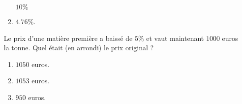 \begin{exercice}
\begin{multicols}{2}
\begin{enumerate}
\begin{enumerate}
                \( 10\%\)
            \item
                \( 4.76\%\).
        \end{enumerate}
        Le prix d'une matière première a baissé de \( 5\%\) et vaut maintenant \( 1000\) euros la tonne. Quel était (en arrondi) le prix original ?
        \begin{enumerate}
            \item
                \( 1050\) euros.
            \item
                \( 1053\) euros.
            \item
                \( 950\) euros.
        \end{enumerate}
    \end{enumerate}
    \end{multicols}
        
\end{exercice}
